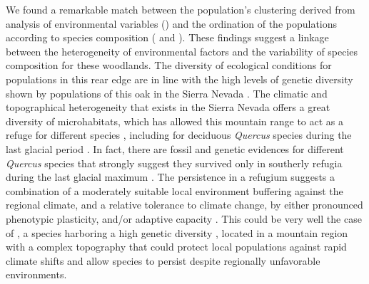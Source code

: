 We found a remarkable match between the population's clustering derived from analysis of environmental variables () and the ordination of the populations according to species composition ( and ). These findings suggest a linkage between the heterogeneity of environmental factors and the variability of species composition for these woodlands. The diversity of ecological conditions for \Qp populations in this rear edge are in line with the high levels of genetic diversity shown by populations of this oak in the Sierra Nevada \autocite{ValbuenaCarabanaGil2013GeneticResilience,ValbuenaCarabanaGil2017CentenaryCoppicing}. The climatic and topographical heterogeneity that exists in the Sierra Nevada offers a great diversity of microhabitats, which has allowed this mountain range to act as a refuge for different species \autocite{MedailDiadema2009GlacialRefugia,GomezLunt2007RefugiaRefugia,BlancoPastoretal2019TopographyExplains}, including for deciduous \emph{Quercus} species during the last glacial period \autocite{Breweretal2002SpreadDeciduous,Olaldeetal2002WhiteOaks,RodriguezSanchezetal2010TreeRange}. In fact, there are fossil and genetic evidences for different \emph{Quercus} species that strongly suggest they survived only in southerly refugia during the last glacial maximum \autocite{Breweretal2002SpreadDeciduous,Petitetal2002IdentificationRefugia,BhagwatWillis2008SpeciesPersistence,BirksWillis2008AlpinesTrees}. The persistence in a refugium suggests a combination of a moderately suitable local environment buffering against the regional climate, and a relative tolerance to climate change, by either pronounced phenotypic plasticity, and/or adaptive capacity \autocite{Gavinetal2014ClimateRefugia}. This could be very well the case of \Qp, a species harboring a high genetic diversity \autocite{ValbuenaCarabanaGil2013GeneticResilience}, located in a mountain region with a complex topography that could protect local populations against rapid climate shifts and allow species to persist despite regionally unfavorable environments.

